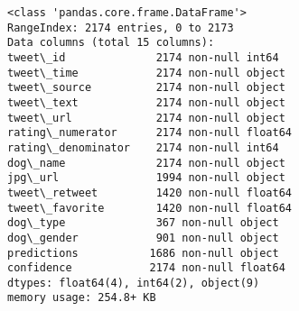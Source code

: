 \documentclass[11pt]{article}
\begin{document}
    \begin{Verbatim}[commandchars=\\\{\}]
<class 'pandas.core.frame.DataFrame'>
RangeIndex: 2174 entries, 0 to 2173
Data columns (total 15 columns):
tweet\_id              2174 non-null int64
tweet\_time            2174 non-null object
tweet\_source          2174 non-null object
tweet\_text            2174 non-null object
tweet\_url             2174 non-null object
rating\_numerator      2174 non-null float64
rating\_denominator    2174 non-null int64
dog\_name              2174 non-null object
jpg\_url               1994 non-null object
tweet\_retweet         1420 non-null float64
tweet\_favorite        1420 non-null float64
dog\_type              367 non-null object
dog\_gender            901 non-null object
predictions           1686 non-null object
confidence            2174 non-null float64
dtypes: float64(4), int64(2), object(9)
memory usage: 254.8+ KB

    \end{Verbatim}


    
    
    
    
\end{document}
